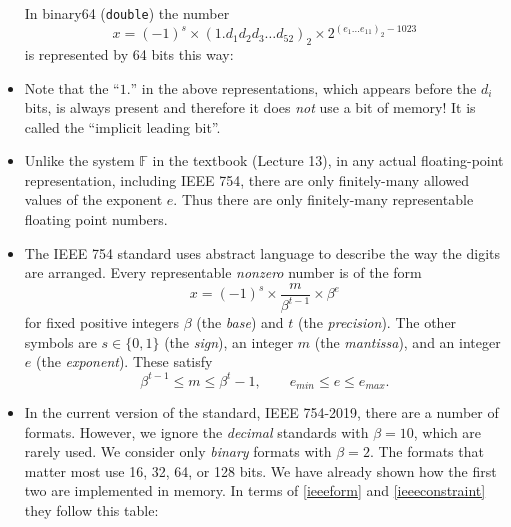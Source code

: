 \documentclass[11pt]{amsart}
\begin{document}
\begin{itemize}
\noindent In binary64 (\texttt{double}) the number
       $$x = (-1)^s \times \left(1.d_1 d_2 d_3 \dots d_{52}\right)_{2} \times 2^{\left(e_1\dots e_{11}\right)_2 - 1023}$$
is represented by 64 bits this way:

\medskip

\item Note that the ``$1.$'' in the above representations, which appears before the $d_i$ bits, is always present and therefore it does \emph{not} use a bit of memory!  It is called the ``implicit leading bit''.

\item Unlike the system $\mathbb{F}$ in the textbook (Lecture 13), in any actual floating-point representation, including IEEE 754, there are only finitely-many allowed values of the exponent $e$.  Thus there are only finitely-many representable floating point numbers.

\item The IEEE 754 standard uses abstract language to describe the way the digits are arranged.  Every representable \emph{nonzero} number is of the form
\begin{equation}
x = (-1)^s \times \frac{m}{\beta^{t-1}} \times \beta^e  \label{ieeeform}
\end{equation}
for fixed positive integers $\beta$ (the \emph{base}) and $t$ (the \emph{precision}).  The other symbols are $s\in\{0,1\}$ (the \emph{sign}), an integer $m$ (the \emph{mantissa}), and an integer $e$ (the \emph{exponent}).  These satisfy
\begin{equation}
\beta^{t-1} \le m \le \beta^t - 1, \qquad e_{min} \le e \le e_{max}.  \label{ieeeconstraint}
\end{equation}

\item In the current version of the standard, IEEE 754-2019, there are a number of formats.  However, we ignore the \emph{decimal} standards with $\beta=10$, which are rarely used.  We consider only \emph{binary} formats with $\beta=2$.  The formats that matter most use 16, 32, 64, or 128 bits.  We have already shown how the first two are implemented in memory.  In terms of \eqref{ieeeform} and \eqref{ieeeconstraint} they follow this table:


\end{itemize}
\end{document}
